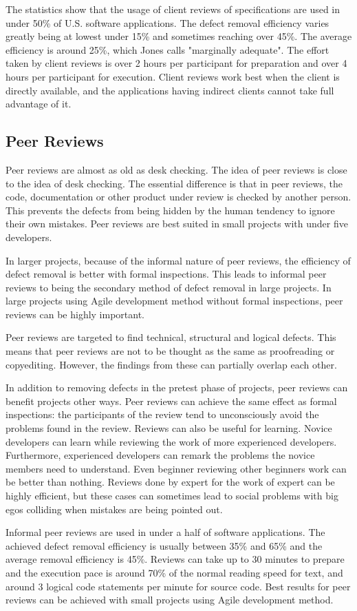 The statistics show that the usage of client reviews of specifications are used in under 50\% of U.S. software applications. The defect removal efficiency varies greatly being at lowest under 15\% and sometimes reaching over 45\%. The average efficiency is around 25\%, which Jones calls "marginally adequate". The effort taken by client reviews is over 2 hours per participant for preparation and over 4 hours per participant for execution. Client reviews work best when the client is directly available, and the applications having indirect clients cannot take full advantage of it.

\subsection{Peer Reviews} 
\label{subsec:peerreview}

Peer reviews are almost as old as desk checking. The idea of peer reviews is close to the idea of desk checking. The essential difference is that in peer reviews, the code, documentation or other product under review is checked by another person. This prevents the defects from being hidden by the human tendency to ignore their own mistakes. Peer reviews are best suited in small projects with under five developers. 

In larger projects, because of the informal nature of peer reviews, the efficiency of defect removal is better with formal inspections. This leads to informal peer reviews to being the secondary method of defect removal in large projects. In large projects using Agile development method without formal inspections, peer reviews can be highly important.

Peer reviews are targeted to find technical, structural and logical defects. This means that peer reviews are not to be thought as the same as proofreading or copyediting. However, the findings from these can partially overlap each other.

In addition to removing defects in the pretest phase of projects, peer reviews can benefit projects other ways. Peer reviews can achieve the same effect as formal inspections: the participants of the review tend to unconsciously avoid the problems found in the review. Reviews can also be useful for learning. Novice developers can learn while reviewing the work of more experienced developers. Furthermore, experienced developers can remark the problems the novice members need to understand. Even beginner reviewing other beginners work can be better than nothing. Reviews done by expert for the work of expert can be highly efficient, but these cases can sometimes lead to social problems with big egos colliding when mistakes are being pointed out.

Informal peer reviews are used in under a half of software applications. The achieved defect removal efficiency is usually between 35\% and 65\% and the average removal efficiency is 45\%. Reviews can take up to 30 minutes to prepare and the execution pace is around 70\% of the normal reading speed for text, and around 3 logical code statements per minute for source code. Best results for peer reviews can be achieved with small projects using Agile development method.